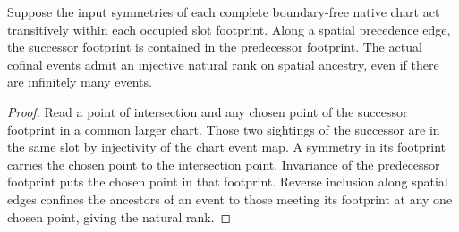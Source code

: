 \begin{theorem}
\label{hir:g8-native-slotwise-spatial-rank}
\leanok
Suppose the input symmetries of each complete boundary-free
native chart act transitively within each occupied slot footprint.
Along a spatial precedence edge, the successor footprint is
contained in the predecessor footprint. The actual cofinal
events admit an injective natural rank on spatial ancestry, even
if there are infinitely many events.
\end{theorem}
\begin{proof}
Read a point of intersection and any chosen point of the
successor footprint in a common larger chart. Those two
sightings of the successor are in the same slot by injectivity
of the chart event map. A symmetry in its footprint carries
the chosen point to the intersection point. Invariance of
the predecessor footprint puts the chosen point in that
footprint. Reverse inclusion along spatial edges confines
the ancestors of an event to those meeting its footprint
at any one chosen point, giving the natural rank.
\end{proof}

